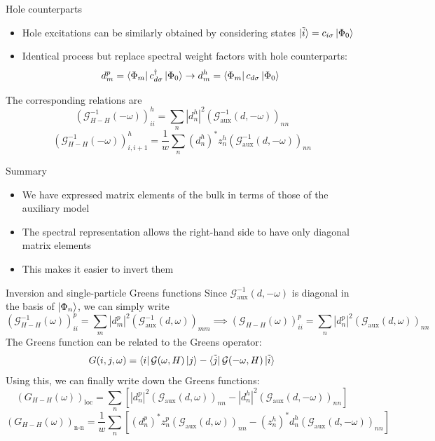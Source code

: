 \documentclass[aspectratio=169]{beamer}
\begin{document}
\begin{frame}[noframenumbering]{Hole counterparts}
	\begin{itemize}
		\item Hole excitations can be similarly obtained by considering states \(\ket{\tilde i} = c_{i\sigma}\ket{\Phi_0}\)
		\item Identical process but replace spectral weight factors with hole counterparts:
			\[d^p_m = \bra{\Phi_m}c^\dagger_{d\sigma}\ket{\Phi_0} \to d^h_m = \bra{\Phi_m}c_{d\sigma}\ket{\Phi_0}\]
	\end{itemize} 
The corresponding relations are
\[\left(\mathcal{G}^{-1}_{H-H}(-\omega)\right)^h_{ii} = \sum_{n} |d^h_n|^2 \left(\mathcal{G}^{-1}_\text{aux}(d, -\omega)\right)_{nn}\]
\[\left(\mathcal{G}^{-1}_{H-H}\left(-\omega\right) \right)^h_{i,i+1} = \frac{1}{w} \sum_n \left(d^h_n\right)^* z^h_n \left(\mathcal{G}^{-1}_\text{aux}(d, -\omega) \right)_{nn}\]
\end{frame}

\begin{frame}[noframenumbering]{Summary}
	\begin{itemize}
	\item We have expressed matrix elements of the bulk in terms of those of the auxiliary model
	\item The spectral representation allows the right-hand side to have only diagonal matrix elements
	\item This makes it easier to invert them
	\end{itemize}
\end{frame}

\begin{frame}[noframenumbering]{Inversion and single-particle Greens functions}
	Since \(\mathcal{G}^{-1}_\text{aux}(d, -\omega)\) is diagonal in the basis of \(\ket{\Phi_n}\), we can simply write
	\[\left(\mathcal{G}^{-1}_{H-H}(\omega)\right)^p_{ii} = \sum_{m} |d^p_m|^2 \left(\mathcal{G}^{-1}_\text{aux}(d, \omega)\right)_{mm} \implies \left(\mathcal{G}_{H-H}(\omega)\right)^p_{ii} = \sum_{n} |d^p_n|^2 \left(\mathcal{G}_\text{aux}(d, \omega)\right)_{nn}\]
The Greens function can be related to the Greens operator:
\[G({i}, j, \omega) = \bra{{i}} \mathcal{G}(\omega, H) \ket{j} - \bra{\tilde{j}} \mathcal{G}(-\omega, H) \ket{\tilde{i}}\]
Using this, we can finally write down the Greens functions:
\[\left(G_{H-H}(\omega)\right)_\text{loc} = \sum_n \left[|d^p_n|^2 \left(\mathcal{G}_\text{aux}(d, \omega)\right)_{nn} - |d^h_n|^2 \left(\mathcal{G}_\text{aux}(d, -\omega)\right)_{nn}\right]\]
\[\left(G_{H-H}(\omega)\right)_\text{n-n} = \frac{1}{w}\sum_n \left[\left(d^p_n\right)^* z^p_n \left(\mathcal{G}_\text{aux}(d, \omega) \right)_{nn} - \left(z^h_n\right)^* d^h_n \left(\mathcal{G}_\text{aux}(d, -\omega)\right)_{nn}\right]\]
\end{frame}
\end{document}
